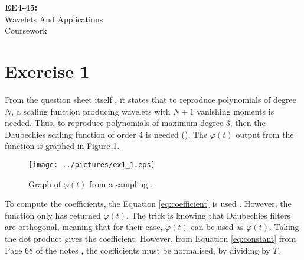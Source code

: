 \documentclass[11pt,a4paper]{report}
\newcommand{\mychapter}[2]
{
    \setcounter{chapter}{#1}
    \setcounter{section}{0}
    \chapter*{#2}
    \addcontentsline{toc}{chapter}{#2}
}
\begin{document}
\begin{titlepage}
\vspace*{\fill}

\begin{center}

\Huge{\textbf{EE4-45:}\\ Wavelets And Applications}\\
\vspace{1cm}
\Huge{Coursework}

\end{center}

\vspace*{\fill}

\end{titlepage}

\tableofcontents
\newpage

\mychapter{1}{Exercise 1}

\setcounter{page}{1}

From the question sheet itself \cite{question}, it states that to reproduce polynomials of degree $N$, a scaling function producing wavelets with $N+1$ vanishing moments is needed. Thus, to reproduce polynomials of maximum degree 3, then the Daubechies scaling function of order 4 is needed (). The $\varphi({t})$ output from the  function is graphed in Figure \ref{fig:e1_1}.

\begin{figure}[!ht]
    \centering
    \texttt{[image: ../pictures/ex1\_1.eps]}
    \caption{Graph of $\varphi({t})$ from a sampling .}
    \label{fig:e1_1}
\end{figure}

To compute the coefficients, the Equation \ref{eq:coefficient} is used \cite{question}. However, the function  only has returned $\varphi(t)$. The trick is knowing that Daubechies filters are orthogonal, meaning that for their case, $\varphi(t)$ can be used as $\tilde{\varphi}(t)$. Taking the dot product gives the coefficient. However, from Equation \ref{eq:constant} from Page 68 of the notes \cite{notes}, the coefficients must be normalised, by dividing by $T$.
\end{document}
